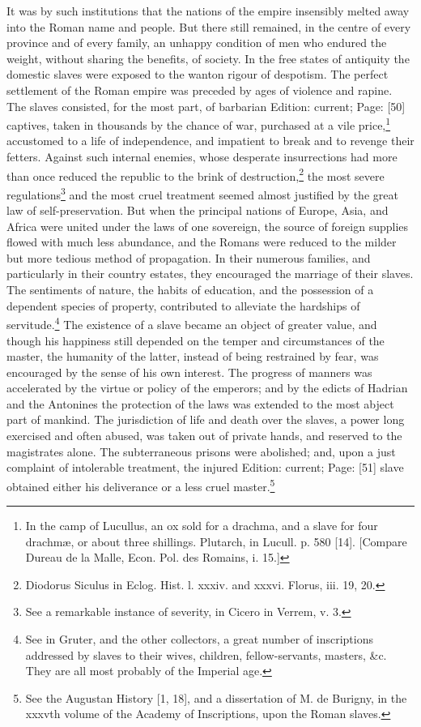 It was by such institutions that the nations of the empire insensibly melted away into the Roman name and people. But there still remained, in the centre of every province and of every family, an unhappy condition of men who endured the weight, without sharing the benefits, of society. In the free states of antiquity the domestic slaves were exposed to the wanton rigour of despotism. The perfect settlement of the Roman empire was preceded by ages of violence and rapine. The slaves consisted, for the most part, of barbarian Edition: current; Page: [50] captives, taken in thousands by the chance of war, purchased at a vile price,\footnote{In the camp of Lucullus, an ox sold for a drachma, and a slave for four drachmæ, or about three shillings. Plutarch, in Lucull. p. 580 [14]. [Compare Dureau de la Malle, Econ. Pol. des Romains, i. 15.]} accustomed to a life of independence, and impatient to break and to revenge their fetters. Against such internal enemies, whose desperate insurrections had more than once reduced the republic to the brink of destruction,\footnote{Diodorus Siculus in Eclog. Hist. l. xxxiv. and xxxvi. Florus, iii. 19, 20.} the most severe regulations\footnote{See a remarkable instance of severity, in Cicero in Verrem, v. 3.} and the most cruel treatment seemed almost justified by the great law of self-preservation. But when the principal nations of Europe, Asia, and Africa were united under the laws of one sovereign, the source of foreign supplies flowed with much less abundance, and the Romans were reduced to the milder but more tedious method of propagation. In their numerous families, and particularly in their country estates, they encouraged the marriage of their slaves. The sentiments of nature, the habits of education, and the possession of a dependent species of property, contributed to alleviate the hardships of servitude.\footnote{See in Gruter, and the other collectors, a great number of inscriptions addressed by slaves to their wives, children, fellow-servants, masters, \&c. They are all most probably of the Imperial age.} The existence of a slave became an object of greater value, and though his happiness still depended on the temper and circumstances of the master, the humanity of the latter, instead of being restrained by fear, was encouraged by the sense of his own interest. The progress of manners was accelerated by the virtue or policy of the emperors; and by the edicts of Hadrian and the Antonines the protection of the laws was extended to the most abject part of mankind. The jurisdiction of life and death over the slaves, a power long exercised and often abused, was taken out of private hands, and reserved to the magistrates alone. The subterraneous prisons were abolished; and, upon a just complaint of intolerable treatment, the injured Edition: current; Page: [51] slave obtained either his deliverance or a less cruel master.\footnote{See the Augustan History [1, 18], and a dissertation of M. de Burigny, in the xxxvth volume of the Academy of Inscriptions, upon the Roman slaves.}

